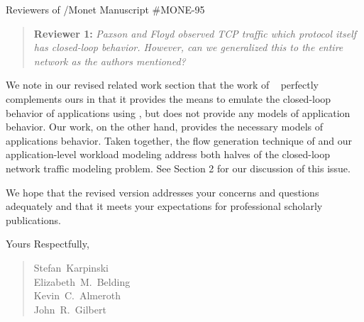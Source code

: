 \documentclass{letter}
\newenvironment{reviewer}[1]%
{\begin{quote}\textbf{Reviewer #1:} \it}{\end{quote}}
\begin{document}
\begin{letter}{Reviewers of /Monet Manuscript \#MONE-95}
\begin{reviewer}{1}
Paxson and Floyd observed TCP traffic which protocol itself has closed-loop behavior. However, can we generalized this to the entire network as the authors mentioned?
\end{reviewer}
We note in our revised related work section that the work of \FHC~\cite{Hernandez06:dissertation} perfectly complements ours in that it provides the means to emulate the closed-loop behavior of applications using , but does not provide any models of application behavior.
Our work, on the other hand, provides the necessary models of applications behavior.
Taken together, the  flow generation technique of \FHC and our application-level workload modeling address both halves of the closed-loop network traffic modeling problem.
See Section 2 for our discussion of this issue.

% 

We hope that the revised version addresses your concerns and questions adequately and that it meets your expectations for professional scholarly publications.

Yours Respectfully,

\begin{quote}
Stefan~Karpinski\\
Elizabeth~M.~Belding\\
Kevin~C.~Almeroth\\
John~R.~Gilbert
\end{quote}

\vfill



\end{letter}
\end{document}
